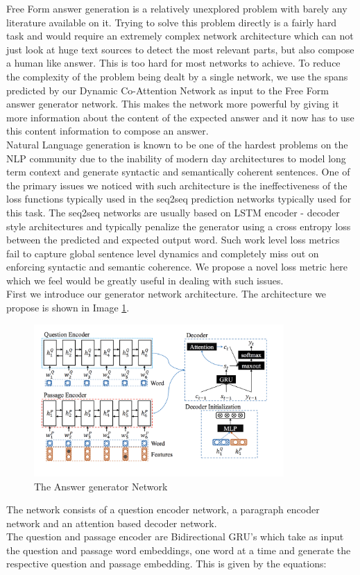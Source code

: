 Free Form answer generation is a relatively unexplored problem with barely any literature available on it. Trying to solve this problem directly is a fairly hard task and would require an extremely complex network architecture which can not just look at huge text sources to detect the most relevant parts, but also compose a human like answer. This is too hard for most networks to achieve. To reduce the complexity of the problem being dealt by a single network, we use the spans predicted by our Dynamic Co-Attention Network as input to the Free Form answer generator network. This makes the network more powerful by giving it more information about the content of the expected answer and it now has to use this content information to compose an answer. \\
Natural Language generation is known to be one of the hardest problems on the NLP community due to the inability of modern day architectures to model long term context and generate syntactic and semantically coherent sentences. One of the primary issues we noticed with such architecture is the ineffectiveness of the loss functions typically used in the seq2seq prediction networks typically used for this task. The seq2seq networks are usually based on LSTM encoder - decoder style architectures and typically penalize the generator using a cross entropy loss between the predicted and expected output word. Such work level loss metrics fail to capture global sentence level dynamics and completely miss out on enforcing syntactic and semantic coherence. We propose a novel loss metric here which we feel would be greatly useful in dealing with such issues.\\
First we introduce our generator network architecture. The architecture we propose is shown in Image \ref{im:im_gen}.
\begin{figure}[h]
    \centering
    \includegraphics[width=0.85\textwidth]{images/ans_net.png}
    \caption{The Answer generator Network}
    \label{im:im_gen}
\end{figure}
The network consists of a question encoder network, a paragraph encoder network and an attention based decoder network.\\
The question and passage encoder are Bidirectional GRU's which take as input the question and passage word embeddings, one word at a time and generate the respective question and passage embedding. This is given by the equations:

